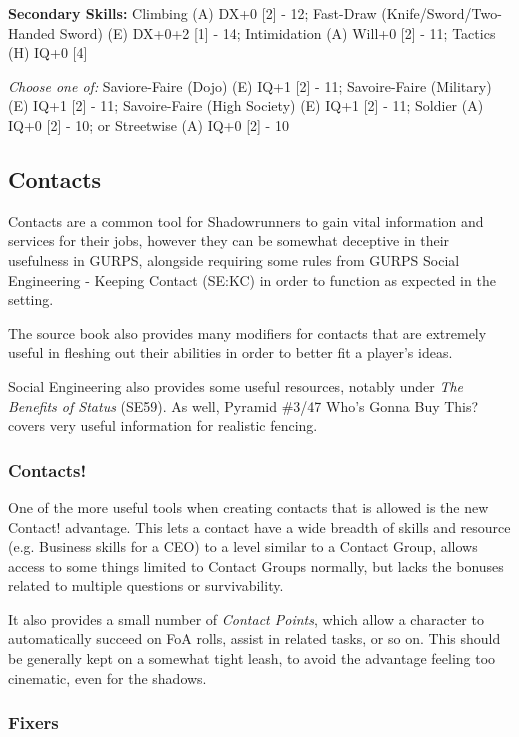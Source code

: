 \begin{multicols}{2}
	\textbf{Secondary Skills:}
	Climbing (A) DX+0 [2] - 12; Fast-Draw (Knife/Sword/Two-Handed Sword) (E) DX+0+2 [1] - 14; Intimidation (A) Will+0 [2] - 11; Tactics (H) IQ+0 [4]
	
	\textit{Choose one of:}
	Saviore-Faire (Dojo) (E) IQ+1 [2] - 11; Savoire-Faire (Military) (E) IQ+1 [2] - 11; Savoire-Faire (High Society) (E) IQ+1 [2] - 11; Soldier (A) IQ+0 [2] - 10; or Streetwise (A) IQ+0 [2] - 10
	
	\subsection{Contacts}\label{Contacts}
	
	Contacts are a common tool for Shadowrunners to gain vital information and services for their jobs, however they can be somewhat deceptive in their usefulness in GURPS, alongside requiring some rules from GURPS Social Engineering - Keeping Contact (SE:KC) in order to function as expected in the setting.
	
	The source book also provides many modifiers for contacts that are extremely useful in fleshing out their abilities in order to better fit a player's ideas.
	
	Social Engineering also provides some useful resources, notably under \textit{The Benefits of Status} (SE59). As well, Pyramid \#3/47 Who's Gonna Buy This? covers very useful information for realistic fencing.
	
	\subsubsection{Contacts!}
	
	One of the more useful tools when creating contacts that is allowed is the new Contact! advantage. This lets a contact have a wide breadth of skills and resource (e.g. Business skills for a CEO) to a level similar to a Contact Group, allows access to some things limited to Contact Groups normally, but lacks the bonuses related to multiple questions or survivability. 
	
	It also provides a small number of \textit{Contact Points}, which allow a character to automatically succeed on FoA rolls, assist in related tasks, or so on. This should be generally kept on a somewhat tight leash, to avoid the advantage feeling too cinematic, even for the shadows.
	
	\subsubsection{Fixers}
	

\end{multicols}
